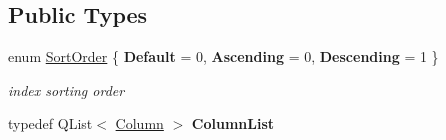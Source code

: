 \subsection*{Public Types}
\begin{DoxyCompactItemize}
\item 
\mbox{\label{class_q_sql_migrator_1_1_structure_1_1_index_a237ef125893ca00672374a7fb3cff687}} 
enum \hyperlink{class_q_sql_migrator_1_1_structure_1_1_index_a237ef125893ca00672374a7fb3cff687}{Sort\+Order} \{ {\bfseries Default} = 0, 
{\bfseries Ascending} = 0, 
{\bfseries Descending} = 1
 \}\begin{DoxyCompactList}\small\item\em index sorting order \end{DoxyCompactList}
\item 
\mbox{\label{class_q_sql_migrator_1_1_structure_1_1_index_ac59382bc63333d2b40bfeb2bb072478b}} 
typedef Q\+List$<$ \hyperlink{class_q_sql_migrator_1_1_structure_1_1_index_1_1_column}{Column} $>$ {\bfseries Column\+List}
\end{DoxyCompactItemize}
